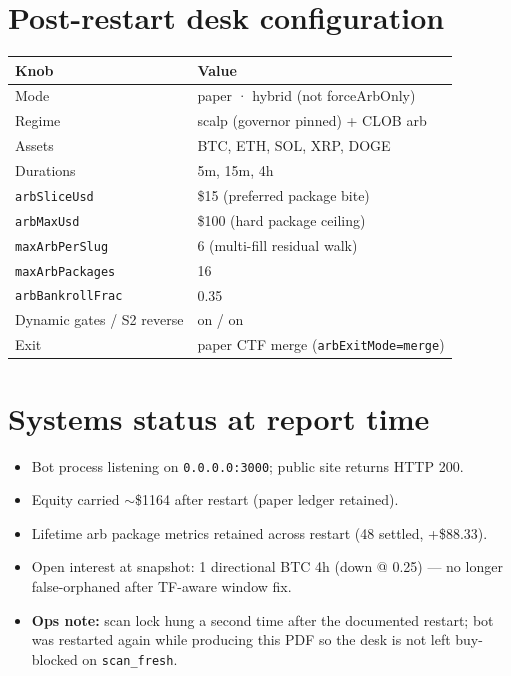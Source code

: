 \documentclass[11pt,a4paper]{article}
\begin{document}
\section{Post-restart desk configuration}
\begin{table}[h]
\centering
\begin{tabular}{@{}ll@{}}
\toprule
\textbf{Knob} & \textbf{Value} \\
\midrule
Mode & paper · hybrid (not forceArbOnly) \\
Regime & scalp (governor pinned) + CLOB arb \\
Assets & BTC, ETH, SOL, XRP, DOGE \\
Durations & 5m, 15m, 4h \\
\texttt{arbSliceUsd} & \$15 (preferred package bite) \\
\texttt{arbMaxUsd} & \$100 (hard package ceiling) \\
\texttt{maxArbPerSlug} & 6 (multi-fill residual walk) \\
\texttt{maxArbPackages} & 16 \\
\texttt{arbBankrollFrac} & 0.35 \\
Dynamic gates / S2 reverse & on / on \\
Exit & paper CTF merge (\texttt{arbExitMode=merge}) \\
\bottomrule
\end{tabular}
\end{table}

\section{Systems status at report time}
\begin{itemize}[leftmargin=*,itemsep=0.3em]
  \item Bot process listening on \texttt{0.0.0.0:3000}; public site returns HTTP 200.
  \item Equity carried $\sim$\$1164 after restart (paper ledger retained).
  \item Lifetime arb package metrics retained across restart (48 settled, +\$88.33).
  \item Open interest at snapshot: 1 directional BTC 4h (down @ 0.25) --- no longer false-orphaned after TF-aware window fix.
  \item \textbf{Ops note:} scan lock hung a second time after the documented restart; bot was restarted again while producing this PDF so the desk is not left buy-blocked on \texttt{scan\_fresh}.
\end{itemize}
\end{document}
